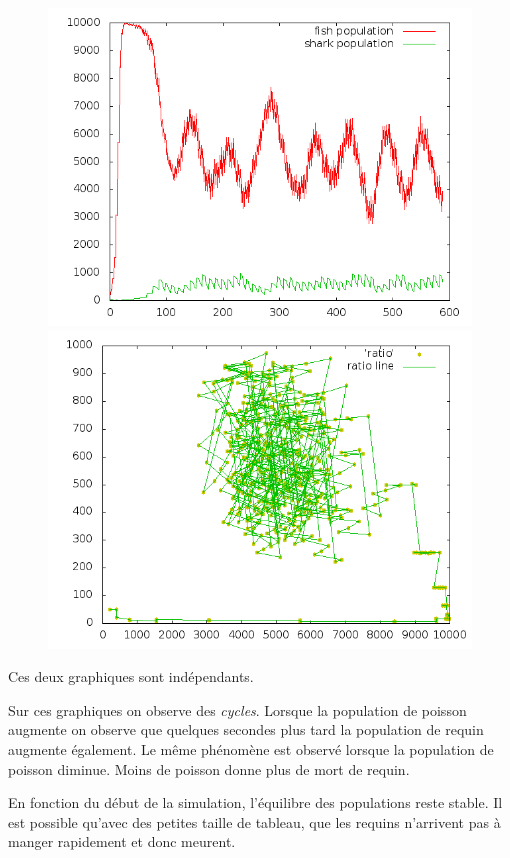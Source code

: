 \documentclass[a4paper,12pt]{report}
\begin{document}
\begin{figure}[!ht]
	\center
	\includegraphics[scale=0.4]{./image/graph.png}
	\includegraphics[scale=0.4]{./image/ratio.png}
\end{figure}

Ces deux graphiques sont indépendants.

Sur ces graphiques on observe des \textit{cycles}. Lorsque la population de poisson augmente on observe que quelques secondes plus tard la population de requin augmente également. Le même phénomène est observé lorsque la population de poisson diminue. Moins de poisson donne plus de mort de requin.

En fonction du début de la simulation, l'équilibre des populations reste stable. Il est possible qu'avec des petites taille de tableau, que les requins n'arrivent pas à manger rapidement et donc meurent.
\end{document}
